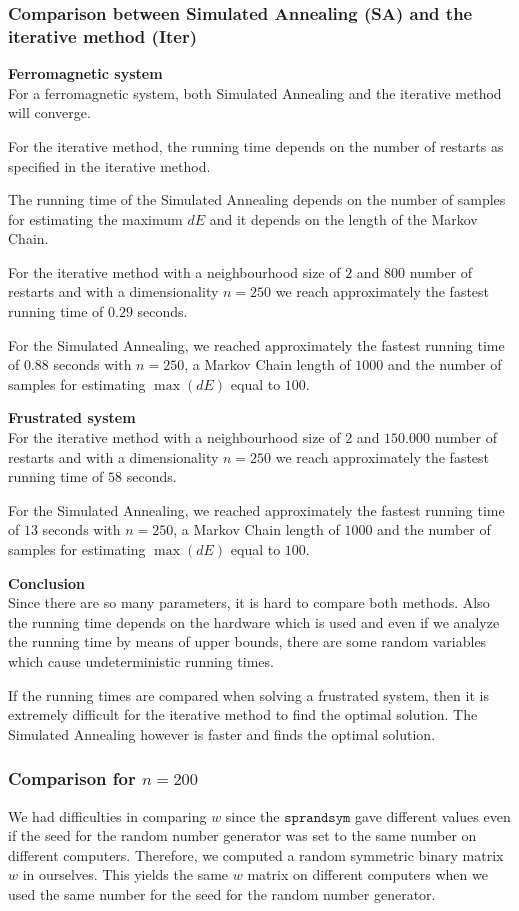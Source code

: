 \documentclass[10pt,a4paper]{article}
\begin{document}
\subsubsection{Comparison between Simulated Annealing (SA) and the iterative method (Iter)}

\textbf{Ferromagnetic system}\\
For a ferromagnetic system, both Simulated Annealing and the iterative method will converge.

For the iterative method, the running time depends on the number of restarts as specified in the iterative method.

The running time of the Simulated Annealing depends on the number of samples for estimating the maximum $dE$ and it depends on the length of the Markov Chain.

For the iterative method with a neighbourhood size of $2$ and $800$ number of restarts and with a dimensionality $n=250$ we reach approximately the fastest running time of $0.29$ seconds.

For the Simulated Annealing, we reached approximately the fastest running time of $0.88$ seconds with $n=250$, a Markov Chain length of $1000$ and the number of samples for estimating $\max(dE)$ equal to $100$.

\textbf{Frustrated system}\\
For the iterative method with a neighbourhood size of $2$ and $150.000$ number of restarts and with a dimensionality $n=250$ we reach approximately the fastest running time of $58$ seconds.

For the Simulated Annealing, we reached approximately the fastest running time of $13$ seconds with $n=250$, a Markov Chain length of $1000$ and the number of samples for estimating $\max(dE)$ equal to $100$.

\textbf{Conclusion}\\
Since there are so many parameters, it is hard to compare both methods. Also the running time depends on the hardware which is used and even if we analyze the running time by means of upper bounds, there are some random variables which cause undeterministic running times.

If the running times are compared when solving a frustrated system, then it is extremely difficult for the iterative method to find the optimal solution. The Simulated Annealing however is faster and finds the optimal solution.

\subsubsection{Comparison for $n=200$}
We had difficulties in comparing $w$ since the $\texttt{sprandsym}$ gave different values even if the seed for the random number generator was set to the same number on different computers. Therefore, we computed a random symmetric binary matrix $w$ in ourselves. This yields the same $w$ matrix on different computers when we used the same number for the seed for the random number generator.
\end{document}
